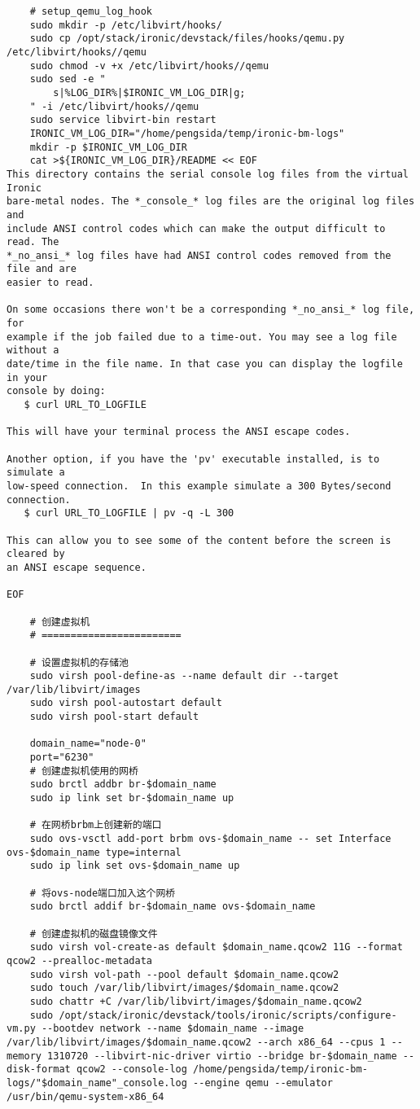 \documentclass[a4paper,left=1.5cm,right=1.5cm,11pt]{article}
\begin{document}
\begin{lstlisting}
	# setup_qemu_log_hook
	sudo mkdir -p /etc/libvirt/hooks/
    sudo cp /opt/stack/ironic/devstack/files/hooks/qemu.py /etc/libvirt/hooks//qemu
    sudo chmod -v +x /etc/libvirt/hooks//qemu
	sudo sed -e "
        s|%LOG_DIR%|$IRONIC_VM_LOG_DIR|g;
    " -i /etc/libvirt/hooks//qemu
	sudo service libvirt-bin restart
	IRONIC_VM_LOG_DIR="/home/pengsida/temp/ironic-bm-logs"
    mkdir -p $IRONIC_VM_LOG_DIR
    cat >${IRONIC_VM_LOG_DIR}/README << EOF
This directory contains the serial console log files from the virtual Ironic
bare-metal nodes. The *_console_* log files are the original log files and
include ANSI control codes which can make the output difficult to read. The
*_no_ansi_* log files have had ANSI control codes removed from the file and are
easier to read.

On some occasions there won't be a corresponding *_no_ansi_* log file, for
example if the job failed due to a time-out. You may see a log file without a
date/time in the file name. In that case you can display the logfile in your
console by doing:
   $ curl URL_TO_LOGFILE

This will have your terminal process the ANSI escape codes.

Another option, if you have the 'pv' executable installed, is to simulate a
low-speed connection.  In this example simulate a 300 Bytes/second connection.
   $ curl URL_TO_LOGFILE | pv -q -L 300

This can allow you to see some of the content before the screen is cleared by
an ANSI escape sequence.

EOF

	# 创建虚拟机
	# ========================

	# 设置虚拟机的存储池
	sudo virsh pool-define-as --name default dir --target /var/lib/libvirt/images
	sudo virsh pool-autostart default
	sudo virsh pool-start default

	domain_name="node-0"
	port="6230"
	# 创建虚拟机使用的网桥
	sudo brctl addbr br-$domain_name
	sudo ip link set br-$domain_name up

	# 在网桥brbm上创建新的端口
	sudo ovs-vsctl add-port brbm ovs-$domain_name -- set Interface ovs-$domain_name type=internal
	sudo ip link set ovs-$domain_name up

	# 将ovs-node端口加入这个网桥
	sudo brctl addif br-$domain_name ovs-$domain_name

	# 创建虚拟机的磁盘镜像文件
	sudo virsh vol-create-as default $domain_name.qcow2 11G --format qcow2 --prealloc-metadata
	sudo virsh vol-path --pool default $domain_name.qcow2
	sudo touch /var/lib/libvirt/images/$domain_name.qcow2
	sudo chattr +C /var/lib/libvirt/images/$domain_name.qcow2
	sudo /opt/stack/ironic/devstack/tools/ironic/scripts/configure-vm.py --bootdev network --name $domain_name --image /var/lib/libvirt/images/$domain_name.qcow2 --arch x86_64 --cpus 1 --memory 1310720 --libvirt-nic-driver virtio --bridge br-$domain_name --disk-format qcow2 --console-log /home/pengsida/temp/ironic-bm-logs/"$domain_name"_console.log --engine qemu --emulator /usr/bin/qemu-system-x86_64
	

\end{lstlisting}
\end{document}
